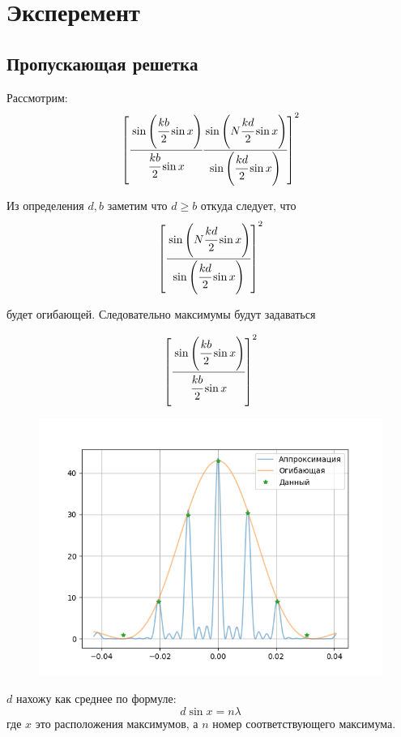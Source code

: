 \section{Эксперемент}
\subsection{Пропускающая решетка}
Рассмотрим:
\begin{equation}
    \left[ \cfrac{\sin\left( \cfrac{kb}{2}\sin{x} \right)}{\cfrac{kb}{2}\sin{x}}
    \cfrac{\sin\left( N\cfrac{kd}{2}\sin{x} \right)}{\sin\left( \cfrac{kd}{2}\sin{x} \right)} \right]^2
\end{equation}

Из определения $d, b$ заметим что $d \geq b$ откуда следует, что
\begin{equation}
    \left[ \cfrac{\sin\left( N\cfrac{kd}{2}\sin{x} \right)}{\sin\left( \cfrac{kd}{2}\sin{x} \right)} \right]^2
\end{equation}

будет огибающей. Следовательно максимумы будут задаваться 

\begin{equation}
    \left[ \cfrac{\sin\left( \cfrac{kb}{2}\sin{x} \right)}{\cfrac{kb}{2}\sin{x}} \right]^2
\end{equation}

\begin{figure}[h]
    \centering
    \includegraphics[trim={0 0 0 0},clip,width=\textwidth]{Ex_2/ex_2_1.png}
    \caption{}
    \label{Task_1_1}
\end{figure}

$d$ нахожу как среднее по формуле:
\begin{equation}
    d\sin{x} = n\lambda
\end{equation}
где $x$ это расположения максимумов, а $n$ номер соответствующего максимума.

